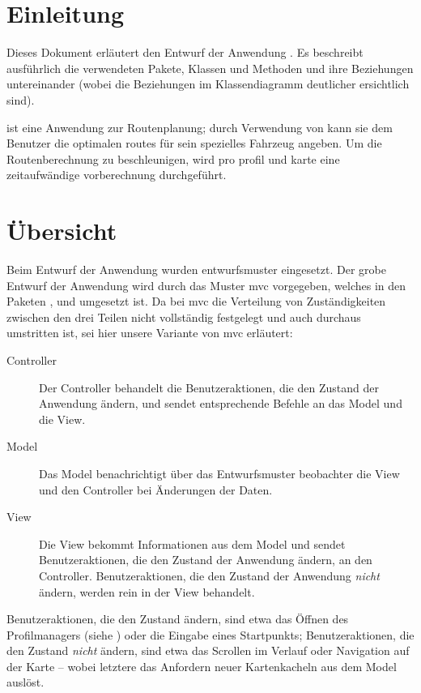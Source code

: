 \documentclass[a4paper, 11pt]{article}
\begin{document}
\section{Einleitung}

Dieses Dokument erläutert den Entwurf der Anwendung \routeKIT. %
Es beschreibt ausführlich die verwendeten Pakete, Klassen und Methoden und ihre Beziehungen untereinander (wobei die Beziehungen im Klassendiagramm deutlicher ersichtlich sind).

\routeKIT ist eine Anwendung zur Routenplanung; durch Verwendung von  kann sie dem Benutzer die optimalen \glspl{route} für sein spezielles Fahrzeug angeben.
Um die Routenberechnung zu beschleunigen, wird pro \gls{profil} und \gls{karte} eine zeitaufwändige \gls{vorberechnung} durchgeführt.


\section{Übersicht}

Beim Entwurf der Anwendung \routeKIT wurden \gls{entwurfsmuster} eingesetzt.
Der grobe Entwurf der Anwendung wird durch das Muster \gls{mvc} vorgegeben, welches in den Paketen ,  und  umgesetzt ist.
Da bei \gls{mvc} die Verteilung von Zuständigkeiten zwischen den drei Teilen nicht vollständig festgelegt und auch durchaus umstritten ist, sei hier unsere Variante von \gls{mvc} erläutert:
\begin{description}
\item[Controller] Der Controller behandelt die Benutzeraktionen, die den Zustand der Anwendung ändern, und sendet entsprechende Befehle an das Model und die View.
\item[Model] Das Model benachrichtigt über das Entwurfsmuster \gls{beobachter} die View und den Controller bei Änderungen der Daten.
\item[View] Die View bekommt Informationen aus dem Model und sendet Benutzeraktionen, die den Zustand der Anwendung ändern, an den Controller.
  Benutzeraktionen, die den Zustand der Anwendung \emph{nicht} ändern, werden rein in der View behandelt.
\end{description}
Benutzeraktionen, die den Zustand ändern, sind etwa das Öffnen des Profilmanagers (siehe ) oder die Eingabe eines Startpunkts;
Benutzeraktionen, die den Zustand \emph{nicht} ändern, sind etwa das Scrollen im Verlauf oder Navigation auf der Karte – wobei letztere das Anfordern neuer Kartenkacheln aus dem Model auslöst.
\end{document}
